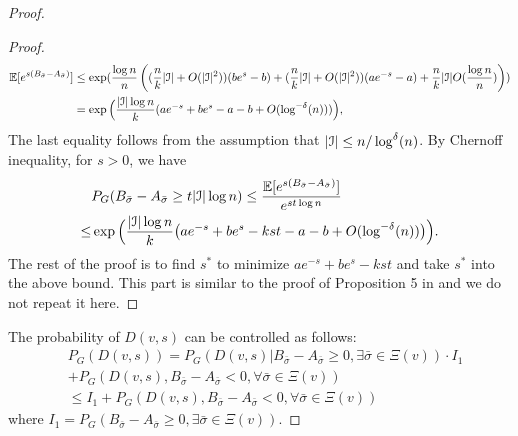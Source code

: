 \documentclass{article}
\begin{document}
\begin{proof}
\begin{proof}
	\begin{align*}
	\mathbb{E}[e^{s(B_{\bar{\sigma}}-A_{\bar{\sigma}})}] & \le
	\exp(\frac{\log n}{n}\left((\frac{n}{k}|\mathcal{I}| + O(|\mathcal{I}|^2))(be^s - b) +(\frac{n}{k} |\mathcal{I}| + O(|\mathcal{I}|^2))(ae^{-s}-a) + \frac{n}{k}|\mathcal{I}|O(\frac{\log n}{n}) \right))
	 \\
	& =
	\exp\Big(\frac{|\mathcal{I}| \log n}{k}(a e^{-s}+b e^s-a-b +
	O(\log^{-\delta}(n))) \Big),
	\end{align*}
	The last equality follows from the assumption that $ |\mathcal{I}| \le n/\log^{\delta}(n)$.
	By Chernoff inequality, for $s>0$, we have
	\begin{align*} 
	& P_G(B_{\bar{\sigma}}-A_{\bar{\sigma}}\ge t |\mathcal{I}| \log n)\le
	\frac{\mathbb{E}[e^{s(B_{\bar{\sigma}}-A_{\bar{\sigma}})}]}{e^{st \log n}}  \\
	\le & \exp\Big(\frac{|\mathcal{I}|\log n}{k} \big(a e^{-s}+b e^s -kst -a-b
	+ O(\log^{-\delta}(n)) \big)\Big)  .
	\end{align*}
	The rest of the proof is to find $s^\ast$ to minimize $a e^{-s}+b e^s -kst$ and take $s^\ast$ into the above bound.
	This part is similar to the proof of Proposition 5 in \cite{ye2020exact} and we do not repeat it here.
	\end{proof}
The probability of $D(v, s)$ can be controlled as follows:
\begin{align*}
&P_G(D(v,s)) = 
P_G(D(v,s)| B_{\bar{\sigma}} - A_{\bar{\sigma}}   \geq 0, \exists \bar{\sigma} \in \Xi(v))
\cdot I_1 \\
&+ P_G(D(v,s) , B_{\bar{\sigma}} - A_{\bar{\sigma}}  < 0, \forall   \bar{\sigma} \in \Xi(v))
 \\
& \leq I_1
+ P_G(D(v,s), B_{\bar{\sigma}} - A_{\bar{\sigma}}    < 0, \forall \bar{\sigma} \in \Xi(v))
\end{align*}
where $I_1 = P_G( B_{\bar{\sigma}} - A_{\bar{\sigma}}  \geq 0, \exists   \bar{\sigma} \in \Xi(v) )$.


\end{proof}
\end{document}
